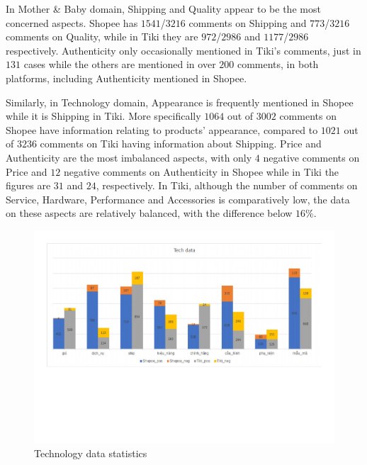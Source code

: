 In Mother \& Baby domain, Shipping and Quality appear to be the most concerned aspects. Shopee has $1541$/$3216$ comments on Shipping and $773$/$3216$ comments on Quality, while in Tiki they are $972$/$2986$ and $1177$/$2986$ respectively. Authenticity only occasionally mentioned in Tiki's comments, just in $131$ cases while the others are mentioned in over $200$ comments, in both platforms, including Authenticity mentioned in Shopee.

Similarly, in Technology domain, Appearance is frequently mentioned in Shopee while it is Shipping in Tiki. More specifically $1064$ out of $3002$ comments on Shopee have information relating to products’ appearance, compared to $1021$ out of $3236$ comments on Tiki having information about Shipping. Price and Authenticity are the most imbalanced aspects, with only $4$ negative comments on Price and $12$ negative comments on Authenticity in Shopee while in Tiki the figures are $31$ and $24$, respectively. In Tiki, although the number of comments on Service, Hardware, Performance and Accessories is comparatively low, the data on these aspects are relatively balanced, with the difference below $16\%$.

\begin{figure}[]
	\centering
	\includegraphics[width=\linewidth]{Chapter2/Figs/tech data.pdf}
	\caption{Technology data statistics}
	\label{fig:tech}
\end{figure}












